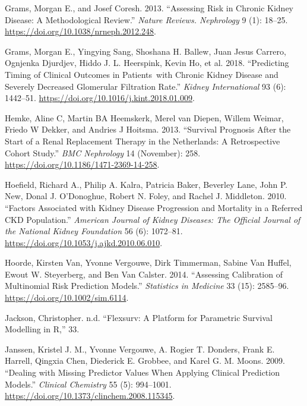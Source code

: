 \documentclass[
]{article}
\newlength{\cslhangindent}
\newenvironment{cslreferences}%
  {\setlength{\parindent}{0pt}%
  \everypar{\setlength{\hangindent}{\cslhangindent}}\ignorespaces}%
  {\par}
\begin{document}
\begin{cslreferences}
\leavevmode\hypertarget{ref-grams_assessing_2013}{}%
Grams, Morgan E., and Josef Coresh. 2013. ``Assessing Risk in Chronic Kidney Disease: A Methodological Review.'' \emph{Nature Reviews. Nephrology} 9 (1): 18--25. \url{https://doi.org/10.1038/nrneph.2012.248}.

\leavevmode\hypertarget{ref-grams_predicting_2018}{}%
Grams, Morgan E., Yingying Sang, Shoshana H. Ballew, Juan Jesus Carrero, Ognjenka Djurdjev, Hiddo J. L. Heerspink, Kevin Ho, et al. 2018. ``Predicting Timing of Clinical Outcomes in Patients~with Chronic Kidney Disease and Severely Decreased Glomerular Filtration Rate.'' \emph{Kidney International} 93 (6): 1442--51. \url{https://doi.org/10.1016/j.kint.2018.01.009}.

\leavevmode\hypertarget{ref-hemke_survival_2013}{}%
Hemke, Aline C, Martin BA Heemskerk, Merel van Diepen, Willem Weimar, Friedo W Dekker, and Andries J Hoitsma. 2013. ``Survival Prognosis After the Start of a Renal Replacement Therapy in the Netherlands: A Retrospective Cohort Study.'' \emph{BMC Nephrology} 14 (November): 258. \url{https://doi.org/10.1186/1471-2369-14-258}.

\leavevmode\hypertarget{ref-hoefield_factors_2010}{}%
Hoefield, Richard A., Philip A. Kalra, Patricia Baker, Beverley Lane, John P. New, Donal J. O'Donoghue, Robert N. Foley, and Rachel J. Middleton. 2010. ``Factors Associated with Kidney Disease Progression and Mortality in a Referred CKD Population.'' \emph{American Journal of Kidney Diseases: The Official Journal of the National Kidney Foundation} 56 (6): 1072--81. \url{https://doi.org/10.1053/j.ajkd.2010.06.010}.

\leavevmode\hypertarget{ref-hoorde_assessing_2014}{}%
Hoorde, Kirsten Van, Yvonne Vergouwe, Dirk Timmerman, Sabine Van Huffel, Ewout W. Steyerberg, and Ben Van Calster. 2014. ``Assessing Calibration of Multinomial Risk Prediction Models.'' \emph{Statistics in Medicine} 33 (15): 2585--96. \url{https://doi.org/10.1002/sim.6114}.

\leavevmode\hypertarget{ref-jackson_flexsurv_nodate}{}%
Jackson, Christopher. n.d. ``Flexsurv: A Platform for Parametric Survival Modelling in R,'' 33.

\leavevmode\hypertarget{ref-janssen_dealing_2009}{}%
Janssen, Kristel J. M., Yvonne Vergouwe, A. Rogier T. Donders, Frank E. Harrell, Qingxia Chen, Diederick E. Grobbee, and Karel G. M. Moons. 2009. ``Dealing with Missing Predictor Values When Applying Clinical Prediction Models.'' \emph{Clinical Chemistry} 55 (5): 994--1001. \url{https://doi.org/10.1373/clinchem.2008.115345}.


\end{cslreferences}
\end{document}
